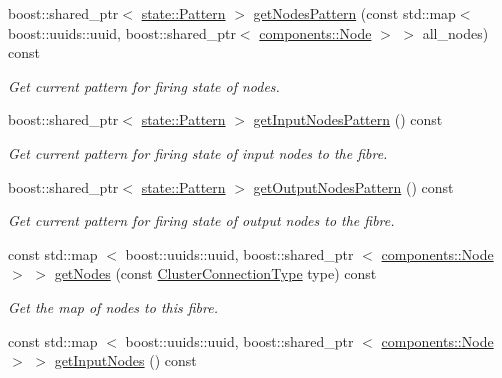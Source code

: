 \begin{DoxyCompactItemize}
boost\-::shared\-\_\-ptr$<$ \hyperlink{classcryomesh_1_1state_1_1Pattern}{state\-::\-Pattern} $>$ \hyperlink{classcryomesh_1_1structures_1_1Fibre_a690dd19606a0611d57cb70cd33810969}{get\-Nodes\-Pattern} (const std\-::map$<$ boost\-::uuids\-::uuid, boost\-::shared\-\_\-ptr$<$ \hyperlink{classcryomesh_1_1components_1_1Node}{components\-::\-Node} $>$ $>$ all\-\_\-nodes) const 
\begin{DoxyCompactList}\small\item\em \-Get current pattern for firing state of nodes. \end{DoxyCompactList}\item 
boost\-::shared\-\_\-ptr$<$ \hyperlink{classcryomesh_1_1state_1_1Pattern}{state\-::\-Pattern} $>$ \hyperlink{classcryomesh_1_1structures_1_1Fibre_ac636d911ba83b83898d8a84e9e1cc7d6}{get\-Input\-Nodes\-Pattern} () const 
\begin{DoxyCompactList}\small\item\em \-Get current pattern for firing state of input nodes to the fibre. \end{DoxyCompactList}\item 
boost\-::shared\-\_\-ptr$<$ \hyperlink{classcryomesh_1_1state_1_1Pattern}{state\-::\-Pattern} $>$ \hyperlink{classcryomesh_1_1structures_1_1Fibre_a0db7ff1c4bb7520f10cb680b7bd9e89e}{get\-Output\-Nodes\-Pattern} () const 
\begin{DoxyCompactList}\small\item\em \-Get current pattern for firing state of output nodes to the fibre. \end{DoxyCompactList}\item 
const std\-::map\*
$<$ boost\-::uuids\-::uuid, \*
boost\-::shared\-\_\-ptr\*
$<$ \hyperlink{classcryomesh_1_1components_1_1Node}{components\-::\-Node} $>$ $>$ \hyperlink{classcryomesh_1_1structures_1_1Fibre_ab4cd1906788d648c47db0675cdf19e22}{get\-Nodes} (const \hyperlink{classcryomesh_1_1structures_1_1Fibre_a1bae341ec1ee07bdc7855b287bee2061}{\-Cluster\-Connection\-Type} type) const 
\begin{DoxyCompactList}\small\item\em \-Get the map of nodes to this fibre. \end{DoxyCompactList}\item 
const std\-::map\*
$<$ boost\-::uuids\-::uuid, \*
boost\-::shared\-\_\-ptr\*
$<$ \hyperlink{classcryomesh_1_1components_1_1Node}{components\-::\-Node} $>$ $>$ \hyperlink{classcryomesh_1_1structures_1_1Fibre_a638dce6d194d2e30ce10fc1694c589b4}{get\-Input\-Nodes} () const 

\end{DoxyCompactItemize}
